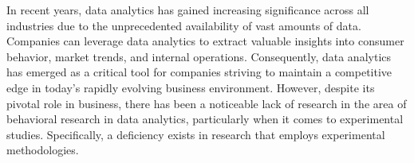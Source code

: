 
In recent years, data analytics has gained increasing significance across all industries due to the unprecedented availability of vast amounts of data. Companies can leverage data analytics to extract valuable insights into consumer behavior, market trends, and internal operations. Consequently, data analytics has emerged as a critical tool for companies striving to maintain a competitive edge in today's rapidly evolving business environment. However, despite its pivotal role in business, there has been a noticeable lack of research in the area of behavioral research in data analytics, particularly when it comes to experimental studies.
Specifically, a deficiency exists in research that employs experimental methodologies. 

